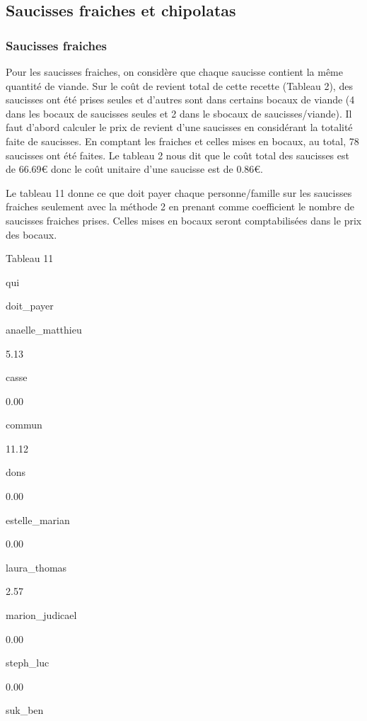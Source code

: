 \documentclass[]{article}
\begin{document}
\hypertarget{saucisses-fraiches-et-chipolatas}{%
\subsection{Saucisses fraiches et
chipolatas}\label{saucisses-fraiches-et-chipolatas}}

\hypertarget{saucisses-fraiches}{%
\subsubsection{Saucisses fraiches}\label{saucisses-fraiches}}

Pour les saucisses fraiches, on considère que chaque saucisse contient
la même quantité de viande. Sur le coût de revient total de cette
recette (Tableau 2), des saucisses ont été prises seules et d'autres
sont dans certains bocaux de viande (4 dans les bocaux de saucisses
seules et 2 dans le sbocaux de saucisses/viande). Il faut d'abord
calculer le prix de revient d'une saucisses en considérant la totalité
faite de saucisses. En comptant les fraiches et celles mises en bocaux,
au total, 78 saucisses ont été faites. Le tableau 2 nous dit que le coût
total des saucisses est de 66.69€ donc le coût unitaire d'une saucisse
est de 0.86€.

Le tableau 11 donne ce que doit payer chaque personne/famille sur les
saucisses fraiches seulement avec la méthode 2 en prenant comme
coefficient le nombre de saucisses fraiches prises. Celles mises en
bocaux seront comptabilisées dans le prix des bocaux.

Tableau 11

qui

doit\_payer

anaelle\_matthieu

5.13

casse

0.00

commun

11.12

dons

0.00

estelle\_marian

0.00

laura\_thomas

2.57

marion\_judicael

0.00

steph\_luc

0.00

suk\_ben
\end{document}

